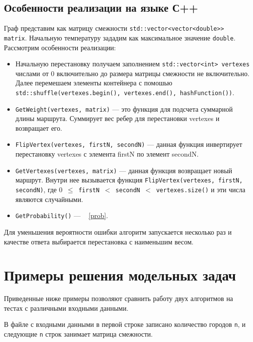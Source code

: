 \documentclass[12pt, a4paper]{article}
\begin{document}
\subsection{Особенности реализации на языке С++}
Граф представим как матрицу смежности \texttt{std::vector<vector<double{>}{>} matrix}. Начальную температуру зададим как максимальное значение \texttt{double}. Рассмотрим особенности реализации:
\begin{itemize}
	\item Начальную перестановку получаем заполнением \texttt{std::vector<int> vertexes} числами от 0 включительно до размера матрицы смежности не включительно. Далее перемешаем элементы контейнера с помошью \linebreak \texttt{std::shuffle(vertexes.begin(), vertexes.end(), hashFunction())}.
	\item \texttt{GetWeight(vertexes, matrix)} --- это функция для подсчета суммарной длины маршрута. Суммирует вес ребер для перестановки vertexes и возвращает его.
	\item \texttt{FlipVertex(vertexes, firstN, secondN)} --- данная функция инвертирует перестановку vertexes с элемента firstN по элемент secondN.
	\item \texttt{GetVertexes(vertexes, matrix)} --- данная функция возвращает новый маршрут. Внутри нее вызывается функция \texttt{FlipVertex(vertexes, firstN, secondN)}, где \texttt{$0$ $\leq$ firstN $<$ secondN $<$ vertexes.size()} и эти числа являются случайными.
	\item \texttt{GetProbability()} --- ~ \eqref{prob}.
\end{itemize}

Для уменьшения вероятности ошибки алгоритм запускается несколько раз и качестве ответа выбирается перестановка с наименьшим весом.


\section{Примеры решения модельных задач} 

Приведенные ниже примеры позволяют сравнить работу двух алгоритмов на тестах с различными входными данными.

В файле с входными данными в первой строке записано количество городов \texttt{n}, и следующие \texttt{n} строк занимает матрица смежности.
\end{document}

